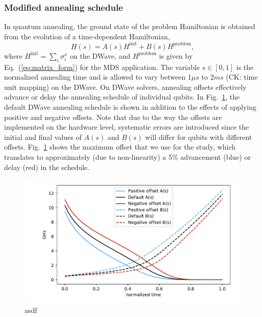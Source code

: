 \documentclass[prd,twocolumn,tightenlines,preprintnumbers,showpacs,superscriptaddress,notitlepage,nofootinbib,eqsecnum,floatfix,longbibliography]{revtex4}
\begin{document}
\subsubsection{Modified annealing schedule}

In quantum annealing, the ground state of the problem Hamiltonian is obtained from the evolution of a time-dependent Hamiltonian,
\begin{equation}
    H(s) = A(s) H^{\textrm{init}} + B(s) H^{\textrm{problem}}, \label{eq:tdhamiltonian}
\end{equation}
where $H^\textrm{init}=\sum_i\sigma^x_i$ on the DWave, and $H^\textrm{problem}$ is given by Eq.~(\ref{eq:matrix_form}) for the MDS application.
The variable $s\in [0, 1]$ is the normalized annealing time and is allowed to vary between 1$\mu s$ to 2$ms$ (CK: time unit mapping) on the DWave.
On DWave solvers, annealing offsets effectively advance or delay the annealing schedule of individual qubits.
In Fig.~\ref{fig:anneal_schedule}, the default DWave annealing schedule is shown in addition to the effects of applying positive and negative offsets.
Note that due to the way the offsets are implemented on the hardware level, systematic errors are introduced since the initial and final values of $A(s)$ and $B(s)$ will differ for qubits with different offsets.
Fig.~\ref{fig:anneal_schedule} shows the maximum offset that we use for the study, which translates to approximately (due to non-linearity) a 5\% advancement (blue) or delay (red) in the schedule.

\begin{figure}[b]
    \centering
    \includegraphics[width=\columnwidth]{./figures/anneal_schedule.pdf}
    \caption{asdf}
    \label{fig:anneal_schedule}
\end{figure}
\end{document}
